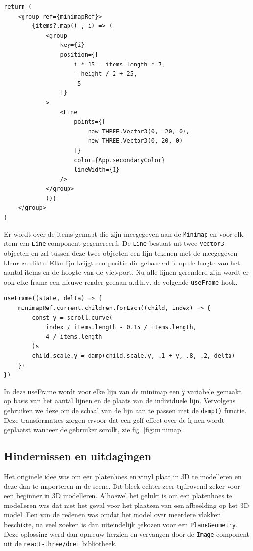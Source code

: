 \begin{BVerbatim}
return (
	<group ref={minimapRef}>
		{items?.map((_, i) => (
			<group 
				key={i} 
				position={[
					i * 15 - items.length * 7,
					- height / 2 + 25,
					-5
				]}
			>
				<Line 
					points={[
						new THREE.Vector3(0, -20, 0),
						new THREE.Vector3(0, 20, 0)
					]} 
					color={App.secondaryColor} 
					lineWidth={1}
				/>
			</group>
			))}
	</group>
)
\end{BVerbatim}
\newline
\newline
Er wordt over de items gemapt die zijn meegegeven aan de \texttt{Minimap} en voor elk item een \texttt{Line} component gegenereerd. De \texttt{Line} bestaat uit twee \texttt{Vector3} objecten en zal tussen deze twee objecten een lijn tekenen met de meegegeven kleur en dikte. Elke lijn krijgt een positie die gebaseerd is op de lengte van het aantal items en de hoogte van de viewport.
Nu alle lijnen gerenderd zijn wordt er ook elke frame een nieuwe render gedaan a.d.h.v. de volgende \texttt{useFrame} hook.
\newline
\newline
\begin{BVerbatim}
useFrame((state, delta) => {
	minimapRef.current.children.forEach((child, index) => {
		const y = scroll.curve(
			index / items.length - 0.15 / items.length,
			4 / items.length
		)s
		child.scale.y = damp(child.scale.y, .1 + y, .8, .2, delta)
	})
})
\end{BVerbatim}

In deze useFrame wordt voor elke lijn van de minimap een \texttt{y} variabele gemaakt op basis van het aantal lijnen en de plaats van de individuele lijn. Vervolgens gebruiken we deze om de schaal van de lijn aan te passen met de \texttt{damp()} functie. Deze transformaties zorgen ervoor dat een golf effect over de lijnen wordt geplaatst wanneer de gebruiker scrollt, zie fig. \ref{fig:minimap}.

\subsection{Hindernissen en uitdagingen}

Het originele idee was om een platenhoes en vinyl plaat in 3D te modelleren en deze dan te importeren in de scene. Dit bleek echter zeer tijdrovend zeker voor een beginner in 3D modelleren. Alhoewel het gelukt is om een platenhoes te modelleren was dat niet het geval voor het plaatsen van een afbeelding op het 3D model. Een van de redenen was omdat het model over meerdere vlakken beschikte, na veel zoeken is dan uiteindelijk gekozen voor een \texttt{PlaneGeometry}. Deze oplossing werd dan opnieuw herzien en vervangen door de \texttt{Image} component uit de \texttt{react-three/drei} bibliotheek.

